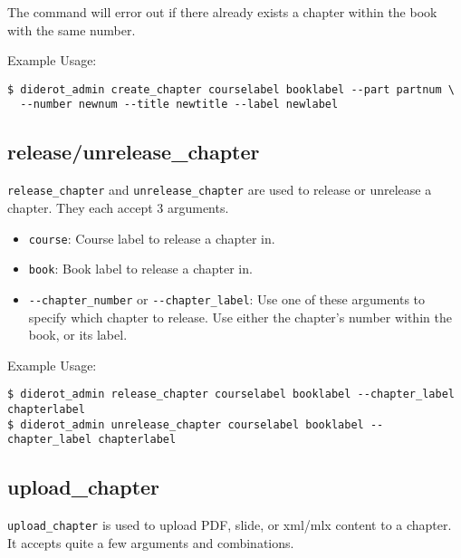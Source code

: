 The command will error out if there already exists a chapter within the book with the same number.

Example Usage:
\begin{verbatim}
$ diderot_admin create_chapter courselabel booklabel --part partnum \
  --number newnum --title newtitle --label newlabel
\end{verbatim}

\subsection{release/unrelease\_chapter}

\verb|release_chapter| and \verb|unrelease_chapter| are used to release or unrelease a chapter. They each accept 3 arguments.

\begin{itemize}
  \item \verb|course|: Course label to release a chapter in. 
  \item \verb|book|: Book label to release a chapter in.

  \item \verb|--chapter_number| or \verb|--chapter_label|: Use one of these arguments to specify which chapter to release. Use either the chapter's number within the book, or its label.
\end{itemize}

Example Usage:
\begin{verbatim}
$ diderot_admin release_chapter courselabel booklabel --chapter_label chapterlabel
$ diderot_admin unrelease_chapter courselabel booklabel --chapter_label chapterlabel
\end{verbatim}

\subsection{upload\_chapter}

\verb|upload_chapter| is used to upload PDF, slide, or xml/mlx content to a chapter.
%
It accepts quite a few arguments and combinations.

